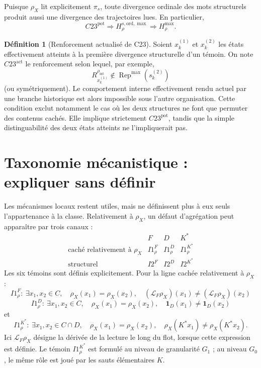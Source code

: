 \documentclass[11pt,a4paper]{article}
\theoremstyle{definition}
\newtheorem{definition}{Définition}[section]
\theoremstyle{remark}
\newcommand{\Rep}{\operatorname{Rep}}
\begin{document}
Puisque $\rho_X$ lit explicitement $\pi_s$, toute divergence ordinale des mots structurels produit aussi une divergence des trajectoires lues. En particulier,
\[
\boxed{C23^{\mathrm{pot}}\Longrightarrow H_{\rho}^{s,\mathrm{ord},\max}
\Longrightarrow H_\rho^{\max}.}
\]

\begin{definition}[Renforcement actualisé de C23]
Soient $x_k^{(1)}$ et $x_k^{(2)}$ les états effectivement atteints à la première divergence structurelle d'un témoin. On note $C23^{\mathrm{act}}$ le renforcement selon lequel, par exemple,
\[
\boxed{
R_{x_k^{(1)}}^{\rho_{\mathrm{int}}}
\notin
\Rep^{\max}\!\left(s_k^{(2)}\right)}
\]
(ou symétriquement). Le comportement interne effectivement rendu actuel par une branche historique est alors impossible sous l'autre organisation. Cette condition exclut notamment le cas où les deux structures ne font que permuter des contenus cachés. Elle implique strictement $C23^{\mathrm{pot}}$, tandis que la simple distinguabilité des deux états atteints ne l'impliquerait pas.
\end{definition}


\section{Taxonomie mécanistique : expliquer sans définir}

Les mécanismes locaux restent utiles, mais ne définissent plus à eux seuls l'appartenance à la classe. Relativement à $\rho_X$, un défaut d'agrégation peut apparaître par trois canaux :
\[
\begin{array}{c|ccc}
&F&D&K^*\\ \hline
\text{caché relativement à }\rho_X
&I1_\rho^F&I1_\rho^D&I1_\rho^{K^*}\\
\text{structurel}
&I2^F&I2^D&I2^{K^*}
\end{array}
\]
Les six témoins sont définis explicitement. Pour la ligne cachée relativement à $\rho_X$ :
\[
\boxed{
I1_\rho^F:\ \exists x_1,x_2\in C,\quad
\rho_X(x_1)=\rho_X(x_2),\quad
(\mathcal L_F\rho_X)(x_1)\neq
(\mathcal L_F\rho_X)(x_2)}
\]
\[
\boxed{
I1_\rho^D:\ \exists x_1,x_2\in C,\quad
\rho_X(x_1)=\rho_X(x_2),\quad
\mathbf 1_D(x_1)\neq\mathbf 1_D(x_2)}
\]
et
\[
\boxed{
I1_\rho^{K^*}:\ \exists x_1,x_2\in C\cap D,\quad
\rho_X(x_1)=\rho_X(x_2),\quad
\rho_X(K^*x_1)\neq\rho_X(K^*x_2)}.
\]
Ici $\mathcal L_F\rho_X$ désigne la dérivée de la lecture le long du flot, lorsque cette expression est définie. Le témoin $I1_\rho^{K^*}$ est formulé au niveau de granularité $G_1$ ; au niveau $G_0$, le même rôle est joué par les sauts élémentaires $K$.
\end{document}
